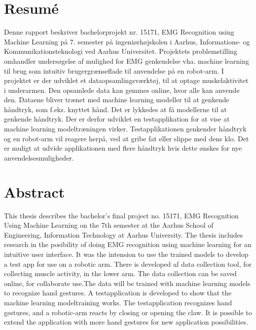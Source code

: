 \thispagestyle{fancy}
\vfill
\section*{Resumé}
\label{sec:resume}
Denne rapport beskriver bachelorprojekt nr. 15171, EMG Recognition using Machine Learning på 7. semester på ingeniørhøjskolen i Aarhus, Informations- og Kommunikationsteknologi ved Aarhus Universitet. Projektets problemstilling omhandler undersøgelse af mulighed for EMG genkendelse vha. machine learning til brug som intuitiv brugergrænseflade til anvendelse på en robot-arm. I projektet er der udviklet et dataopsamlingsværktøj, til at optage muskelaktivitet i underarmen. Den opsamlede data kan gemmes online, hvor alle kan anvende den. Dataene bliver trænet med machine learning modeller til at genkende håndtryk, som f.eks. knyttet hånd. Det er lykkedes at få modellerne til at genkende håndtryk. Der er derfor udviklet en testapplikation for at vise at machine learning modeltræningen virker. Testapplikationen genkender håndtryk og en robot-arm vil reagere herpå, ved at gribe fat eller slippe med dens klo. Det er muligt at udvide applikationen med flere håndtryk hvis dette ønskes for nye anvendelsesmuligheder.

\vfill

\section*{Abstract}
\label{sec:abstract}
This thesis describes the bachelor's final project no. 15171, EMG Recognition Using Machine Learning on the 7th semester at the Aarhus School of Engineering, Information Technology at Aarhus University. The thesis includes research in the posibility of doing EMG recognition using machine learning for an intuitive user interface. It was the intension to use the trained models to develop a test app for use on a robotic arm. There is developed af data collection tool, for collecting muscle activity, in the lower arm. The data collection can be saved online, for collaborate use.The data will be trained with machine learning models to recognize hand gestures. A testapplication is developed to show that the machine learning modeltraining works. The testapplication recognizes hand gestures, and a robotic-arm reacts by closing or opening the claw. It is possible to extend the application with more hand gestures for new application possibilities.
\vfill